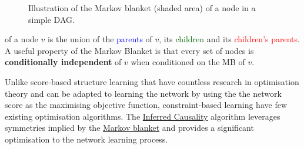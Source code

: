 \begin{figure}
\caption{Illustration of the Markov blanket (shaded area) of a node in a simple DAG.}
\end{figure}

\begin{frm-def}

\textup{of a node $v$ is the union of the \textcolor{blue}{parents} of $v$, its \textcolor{darkgreen}{children} and its \textcolor{red}{children's parents}. A useful property of the Markov Blanket is that every set of nodes is \textbf{conditionally independent} of $v$ when conditioned on the MB of $v$.}
\end{frm-def}

Unlike score-based structure learning that have countless research in optimisation theory and can be adapted to learning the network by using the the network score as the maximising objective function, constraint-based learning have few existing optimisation algorithms. The \hyperref[icalgo]{Inferred Causality} algorithm leverages symmetries implied by the \hyperref[blanky]{Markov blanket} and provides a significant optimisation to the network learning process.\\

\makeatletter
\def\BState{\State\hskip-\ALG@thistlm}
\makeatother

